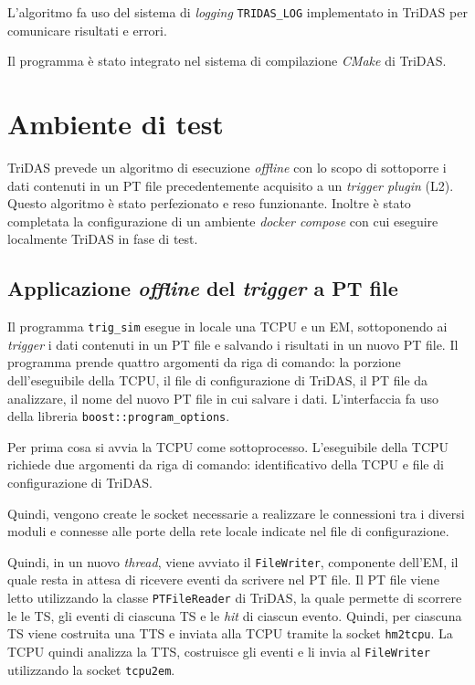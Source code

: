 \documentclass[../main.tex]{subfiles}
\begin{document}
L'algoritmo fa uso del sistema di \emph{logging} \texttt{TRIDAS\_LOG} implementato in TriDAS per comunicare risultati e errori. 

Il programma è stato integrato nel sistema di compilazione \emph{CMake} di TriDAS.
\section{Ambiente di test}
TriDAS prevede un algoritmo di esecuzione \emph{offline} con lo scopo di sottoporre i dati contenuti in un PT file precedentemente acquisito a un \emph{trigger plugin} (L2). Questo algoritmo è stato perfezionato e reso funzionante. Inoltre è stato completata la configurazione di un ambiente \emph{docker compose} con cui eseguire localmente TriDAS in fase di test. 
\subsection{Applicazione \emph{offline} del \emph{trigger} a PT file}
Il programma \texttt{trig\_sim} esegue in locale una TCPU e un EM, sottoponendo ai \emph{trigger} i dati contenuti in un PT file e salvando i risultati in un nuovo PT file.
Il programma prende quattro argomenti da riga di comando: la porzione dell'eseguibile della TCPU, il file di configurazione di TriDAS, il PT file da analizzare, il nome del nuovo PT file in cui salvare i dati. L'interfaccia fa uso della libreria \texttt{boost::program\_options}.

Per prima cosa si avvia la TCPU come sottoprocesso. L'eseguibile della TCPU richiede due argomenti da riga di comando: identificativo della TCPU e file di configurazione di TriDAS.

Quindi, vengono create le socket necessarie a realizzare le connessioni tra i diversi moduli e connesse alle porte della rete locale indicate nel file di configurazione.
%

Quindi, in un nuovo \emph{thread}, viene avviato il \texttt{FileWriter}, componente dell'EM, il quale resta in attesa di ricevere eventi da scrivere nel PT file. 
Il PT file viene letto utilizzando la classe \texttt{PTFileReader} di TriDAS, la quale permette di scorrere le le TS, gli eventi di ciascuna TS e le \emph{hit} di ciascun evento. Quindi, per ciascuna TS viene costruita una TTS e inviata alla TCPU tramite la socket \texttt{hm2tcpu}.
La TCPU quindi analizza la TTS, costruisce gli eventi e li invia al \texttt{FileWriter} utilizzando la socket \texttt{tcpu2em}.
\end{document}
